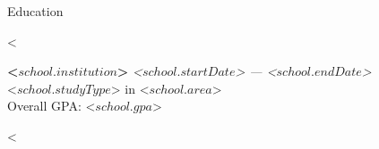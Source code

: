 \documentclass{resume} %
\begin{document}

\begin{rSection}{Education}

<%

{\bf <$ school.institution $>} \hfill {\em <$ school.startDate $> --- <$ school.endDate $>} \\ 
<$ school.studyType $> in <$ school.area $>\\
Overall GPA: <$ school.gpa $>

<%

\end{rSection}





\end{document}

